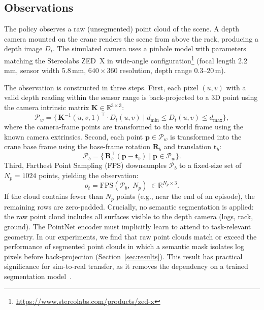 \documentclass[conference]{IEEEtran}
\begin{document}
\subsection{Observations}
\label{sec:obs}
The policy observes a raw (unsegmented) point cloud of the scene.
A depth camera mounted on the crane renders the scene from above the rack, producing a depth image $D_t$.
The simulated camera uses a pinhole model with parameters matching the Stereolabs ZED~X in wide-angle configuration\footnote{\url{https://www.stereolabs.com/products/zed-x}} (focal length 2.2\,mm, sensor width 5.8\,mm, $640 \times 360$ resolution, depth range 0.3--20\,m).

The observation is constructed in three steps.
First, each pixel $(u,v)$ with a valid depth reading within the sensor range is back-projected to a 3D point using the camera intrinsic matrix $\mathbf{K} \in \mathbb{R}^{3 \times 3}$:
\begin{equation}
    \mathcal{P}_w = \big\{\, \mathbf{K}^{-1}(u,v,1)^\top \!\cdot D_t(u,v) \;\big|\; d_{\min} \le D_t(u,v) \le d_{\max} \big\},
\end{equation}
where the camera-frame points are transformed to the world frame using the known camera extrinsics.
Second, each point $\mathbf{p} \in \mathcal{P}_w$ is transformed into the crane base frame using the base-frame rotation $\mathbf{R}_b$ and translation $\mathbf{t}_b$:
\begin{equation}
    \mathcal{P}_b = \big\{\, \mathbf{R}_b^\top(\mathbf{p} - \mathbf{t}_b) \;\big|\; \mathbf{p} \in \mathcal{P}_w \big\}.
\end{equation}
Third, Farthest Point Sampling (FPS) downsamples $\mathcal{P}_b$ to a fixed-size set of $N_p = 1024$ points, yielding the observation:
\begin{equation}
    o_t = \mathrm{FPS}(\mathcal{P}_b,\; N_p) \;\in \mathbb{R}^{N_p \times 3}.
\end{equation}
If the cloud contains fewer than $N_p$ points (e.g., near the end of an episode), the remaining rows are zero-padded.
Crucially, no semantic segmentation is applied: the raw point cloud includes all surfaces visible to the depth camera (logs, rack, ground).
The PointNet encoder must implicitly learn to attend to task-relevant geometry.
In our experiments, we find that raw point clouds match or exceed the performance of segmented point clouds in which a semantic mask isolates log pixels before back-projection (Section~\ref{sec:results}).
This result has practical significance for sim-to-real transfer, as it removes the dependency on a trained segmentation model~\cite{fortin2022instance}.
\end{document}
